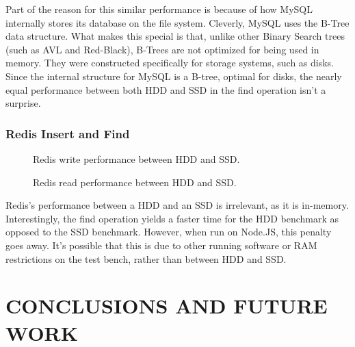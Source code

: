\documentclass[letterpaper, 10 pt, conference]{ieeeconf}
\begin{document}
Part of the reason for this similar performance is because of how MySQL internally stores its database on the file system. Cleverly, MySQL uses the B-Tree data structure. What makes this special is that, unlike other Binary Search trees (such as AVL and Red-Black), B-Trees are not optimized for being used in memory. They were constructed specifically for storage systems, such as disks. Since the internal structure for MySQL is a B-tree, optimal for disks, the nearly equal performance between both HDD and SSD in the find operation isn't a surprise.
\subsubsection{Redis Insert and Find}
\begin{figure}[h]
    \centering
    
        \caption{Redis write performance between HDD and SSD.}
    \label{fig:mesh1}
\end{figure}
\begin{figure}[h]
    \centering
    
        \caption{Redis read performance between HDD and SSD.}
    \label{fig:mesh1}
\end{figure}
Redis's performance between a HDD and an SSD is irrelevant, as it is in-memory. Interestingly, the find operation yields a faster time for the HDD benchmark as opposed to the SSD benchmark. However, when run on Node.JS, this penalty goes away. It's possible that this is due to other running software or RAM restrictions on the test bench, rather than between HDD and SSD.
\section{CONCLUSIONS AND FUTURE WORK}
\end{document}

